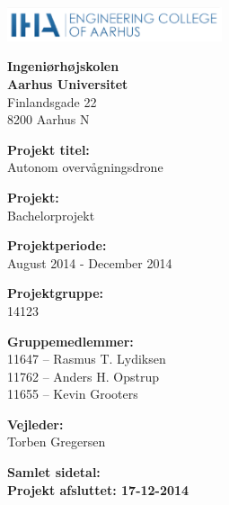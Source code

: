 
{}


\begin{minipage}[t]{0.48\textwidth}
\vspace*{14pt}			%
\vspace{1.2cm}
\includegraphics[height=1cm]{billeder/iha-logo.png} 
\end{minipage}
\hfill

\vspace*{1cm}

\begin{minipage}[t]{0.48\textwidth}

{\small 
\flushleft
\textbf{Ingeniørhøjskolen}\\
\textbf{Aarhus Universitet}  \\
Finlandsgade 22 \\
8200 Aarhus N \\
}

\vspace*{1cm}

\textbf{Projekt titel:} \\[5pt]\bigskip\hspace{2ex}
Autonom overvågningsdrone

\textbf{Projekt:} \\[5pt]\bigskip\hspace{2ex}
Bachelorprojekt

\textbf{Projektperiode:} \\[5pt]\bigskip\hspace{2ex}
August 2014 - December 2014

\textbf{Projektgruppe:} \\[5pt]\bigskip\hspace{2ex}
14123

\textbf{Gruppemedlemmer:} \\[5pt]\hspace*{2ex}
11647 -- Rasmus T. Lydiksen \\\hspace*{2ex}
11762 -- Anders H. Opstrup \\\bigskip\hspace*{2ex}
11655 -- Kevin Grooters \\\bigskip\hspace*{2ex}


\textbf{Vejleder:} \\[5pt]\hspace*{2ex}
Torben Gregersen \\\bigskip\hspace{2ex}

\vspace*{1cm}

\textbf{Samlet sidetal: \pageref{LastPage}} \\
\textbf{Projekt afsluttet: 17-12-2014}


\end{minipage}
\hfill
\vfill

